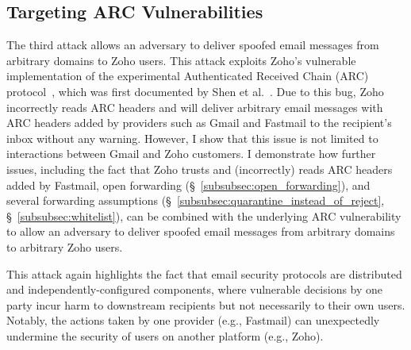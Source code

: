\subsection{Targeting ARC Vulnerabilities}
\label{subsec:attack_zoho_arc}
The third attack allows an adversary to deliver spoofed email messages
from arbitrary domains to Zoho users.  This attack exploits Zoho's
vulnerable implementation of the experimental Authenticated Received
Chain (ARC) protocol~\cite{ARCSpeci1:online}, which was first
documented by Shen et al.~\cite{shen2020weak}. Due to this bug, Zoho
incorrectly reads ARC headers and will deliver arbitrary email
messages with ARC headers added by providers such as Gmail and
Fastmail to the recipient's inbox without any warning.  However, I
show that this issue is not limited to interactions between Gmail and
Zoho customers.  I demonstrate how further issues, including the fact that
Zoho trusts and (incorrectly) reads ARC headers added by Fastmail, open forwarding
(\S~\ref{subsubsec:open_forwarding}), and several forwarding
assumptions (\S~\ref{subsubsec:quarantine_instead_of_reject},
\S~\ref{subsubsec:whitelist}), can be combined with the underlying ARC
vulnerability to allow an adversary to deliver spoofed email messages
from arbitrary domains to arbitrary Zoho users.

This attack again highlights the fact that email security protocols
are distributed and independently-configured components, where
vulnerable decisions by one party incur harm to downstream recipients
but not necessarily to their own users.  Notably, the actions taken
by one provider (e.g., Fastmail) can unexpectedly undermine the
security of users on another platform (e.g., Zoho).



